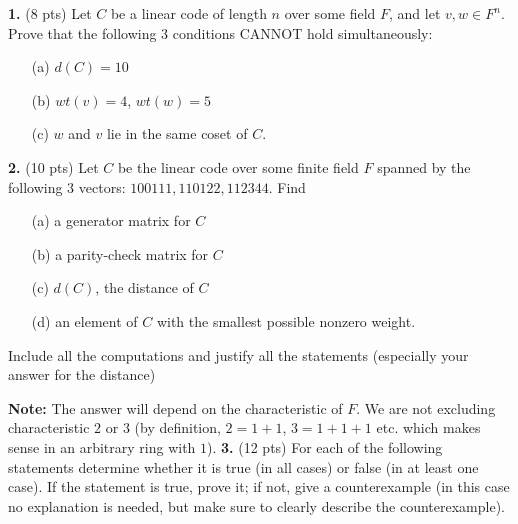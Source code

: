 \documentclass[12pt]{amsart}
\begin{document}
\skv
{\bf 1. }\rm (8 pts) Let $C$ be a linear code of length $n$ over some field $F$, and let $v,w\in F^n$. Prove that the following 3 conditions CANNOT hold simultaneously:
\begin{itemize}
\item[(a)] $d(C)=10$
\item[(b)] $wt(v)=4$, $wt(w)=5$
\item[(c)] $w$ and $v$ lie in the same coset of $C$.
\end{itemize}
\skv
{\bf 2. }\rm (10 pts)  Let $C$ be the linear code over some finite field $F$ spanned by the following 3 vectors: 
$100111, 110122, 112344$. Find
\begin{itemize}
\item[(a)] a generator matrix for $C$
\item[(b)] a parity-check matrix for $C$
\item[(c)] $d(C)$, the distance of $C$
\item[(d)] an element of $C$ with the smallest possible nonzero weight.
\end{itemize}
Include all the computations and justify all the statements (especially your answer for the distance)
\skv



{\bf Note:} The answer will depend on the characteristic of $F$. We are not excluding characteristic $2$ or $3$ (by definition,
$2=1+1$, $3=1+1+1$ etc. which makes sense in an arbitrary ring with $1$).
\skv
{\bf 3. }\rm (12 pts) For each of the following statements determine whether it is true
(in all cases) or false (in at least one case). If the statement is true, prove it;
if not, give a counterexample (in this case no explanation is needed, but make sure to clearly describe the counterexample).
\end{document}
